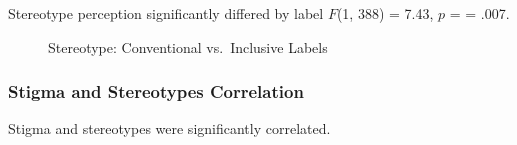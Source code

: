 \documentclass[
  man,
  floatsintext,
  longtable,
  nolmodern,
  notxfonts,
  notimes,
  colorlinks=true,linkcolor=blue,citecolor=blue,urlcolor=blue]{apa7}
\begin{document}
Stereotype perception significantly differed by label \(F\)(1, 388) =
7.43, \(p\) = = .007.

\begin{figure}

\caption{\label{fig-stereotype-by-label}Stereotype: Conventional
vs.~Inclusive Labels}


\end{figure}%

\subsubsection{Stigma and Stereotypes
Correlation}\label{stigma-and-stereotypes-correlation}

Stigma and stereotypes were significantly correlated.
\end{document}
